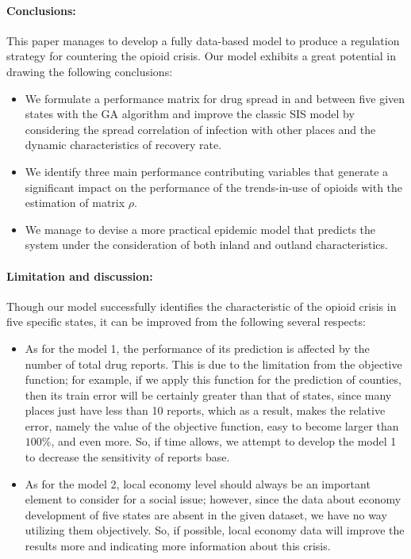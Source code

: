 \paragraph{Conclusions:}
This paper manages to develop a fully data-based model to produce a regulation strategy for countering the opioid crisis. Our model exhibits a great potential in drawing the following conclusions:
\begin{itemize}
	\item We formulate a performance matrix for drug spread in and between five given states with the GA algorithm and improve the classic SIS model by considering the spread correlation of infection with other places and the dynamic characteristics of recovery rate.
	\item We identify three main performance contributing variables that generate a significant impact on the performance of the trends-in-use of opioids with the estimation of matrix $\rho$.
	\item We manage to devise a more practical epidemic model that predicts the system under the consideration of both inland and outland characteristics.
\end{itemize}

\paragraph{Limitation and discussion:}
Though our model successfully identifies the characteristic of the opioid crisis in five specific states, it can be improved from the following several respects:
\begin{itemize}
	\item As for the model 1, the performance of its prediction is affected by the number of total drug reports. This is due to the limitation from the objective function; for example, if we apply this function for the prediction of counties, then its train error will be certainly greater than that of states, since many places just have less than 10 reports, which as a result, makes the relative error, namely the value of the objective function, easy to become larger than $100\%$, and even more. So, if time allows, we attempt to develop the model 1 to decrease the sensitivity of reports base.
	\item As for the model 2, local economy level should always be an important element to consider for a social issue; however, since the data about economy development of five states are absent in the given dataset, we have no way utilizing them objectively. So, if possible, local economy data will improve the results more and indicating more information about this crisis.
\end{itemize}

